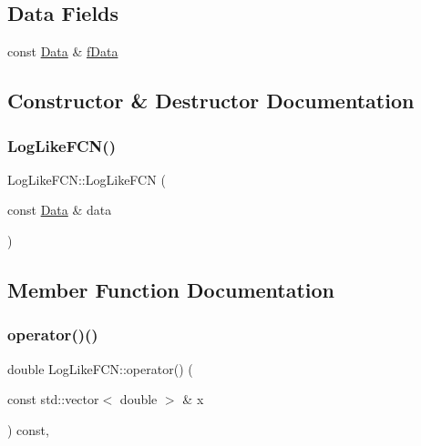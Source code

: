 \subsection*{Data Fields}
\begin{DoxyCompactItemize}
\item 
const \mbox{\hyperlink{ParallelTest_8cxx_a1766b42441c3f4d78bb2b56263a8e058}{Data}} \& \mbox{\hyperlink{structLogLikeFCN_a9331b5750c8fbb26d3e4c1324c2b712f}{f\+Data}}
\end{DoxyCompactItemize}


\subsection{Constructor \& Destructor Documentation}
\mbox{\label{structLogLikeFCN_a45401253d941b65211285bef93b74c59}} 
\subsubsection{\texorpdfstring{LogLikeFCN()}{LogLikeFCN()}}
{\footnotesize\ttfamily Log\+Like\+F\+C\+N\+::\+Log\+Like\+F\+CN (\begin{DoxyParamCaption}\item[{const \mbox{\hyperlink{ParallelTest_8cxx_a1766b42441c3f4d78bb2b56263a8e058}{Data}} \&}]{data }\end{DoxyParamCaption})\hspace{0.3cm}{\ttfamily [inline]}}



\subsection{Member Function Documentation}
\mbox{\label{structLogLikeFCN_a22d42d405147ecea23ab7b3a61003179}} 
\subsubsection{\texorpdfstring{operator()()}{operator()()}}
{\footnotesize\ttfamily double Log\+Like\+F\+C\+N\+::operator() (\begin{DoxyParamCaption}\item[{const std\+::vector$<$ double $>$ \&}]{x }\end{DoxyParamCaption}) const\hspace{0.3cm}{\ttfamily [inline]}, {\ttfamily [virtual]}}

